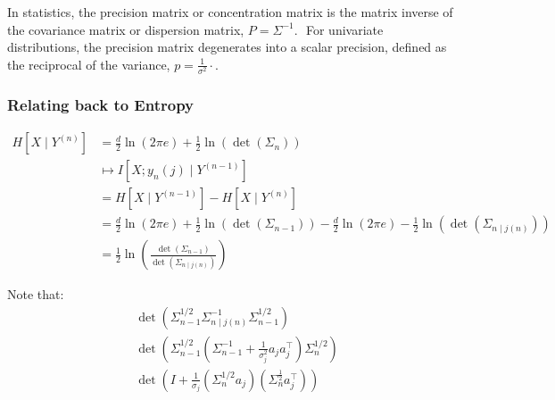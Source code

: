 In statistics, the precision matrix or concentration matrix is the matrix inverse of the covariance matrix or dispersion matrix, $P=\Sigma^{-1}$. ${ }$ For univariate distributions, the precision matrix degenerates into a scalar precision, defined as the reciprocal of the variance, $p=\frac{1}{\sigma^2} \cdot$.

\subsubsection{Relating back to Entropy}
\vspace{-1em}
\begin{align*}
    H[X\mid Y^{(n)}] 
    &= \frac{d}2\ln(2\pi e)+\frac12\ln(\det(\Sigma_n))
    \\
    &\mapsto
    I[X; y_n(j)\mid Y^{(n-1)}]
    \\
    &= H[X\mid Y^{(n-1)}] - H[X\mid Y^{(n)}]
    \\
    &= \frac{d}2\ln(2\pi e)+\frac12\ln(\det(\Sigma_{n-1}))
    -\frac{d}2\ln(2\pi e)-\frac12\ln(\det(\Sigma_{n\mid j(n)}))
    \\
    &= \frac12\ln(\frac{\det(\Sigma_{n-1})}{\det(\Sigma_{n\mid j(n)})})
\end{align*}

Note that:
\begin{align*}
& \det\left(\Sigma_{n-1}^{1 / 2} \Sigma_{n \mid j(n)}^{-1} \Sigma_{n-1}^{1 / 2}\right) \\
& \det\left(\Sigma_{n-1}^{1 / 2}\left(\Sigma_{n-1}^{-1}+\frac{1}{\sigma_j^2} a_ja_j^\top\right) \Sigma_n^{1 / 2}\right) \\
& \det\left(I+\frac{1}{\sigma_j}\left({\Sigma}_n^{1 / 2} a_j\right)\left({\Sigma}_n^{\frac{1}{2}} a_j^{\top}\right)\right)
\end{align*}

